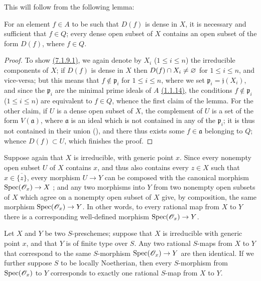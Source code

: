 This will follow from the following lemma:
\begin{lemma}[7.1.9.1]
\label{I.7.1.9.1}
For an element $f\in A$ to be such that $D(f)$ is dense in $X$, it is necessary and sufficient that $f\in Q$; every dense open subset of $X$ contains an open subset of the form $D(f)$, where $f\in Q$.
\end{lemma}

\begin{proof}
To show \hyperref[I.7.1.9]{(7.1.9.1)}, we again denote by $X_i$ ($1\leq i\leq n$) the irreducible components of $X$; if $D(f)$ is dense in $X$ then $D(f)\cap X_i\neq\varnothing$ for $1\leq i\leq n$, and vice-versa; but this means that $f\not\in\mathfrak{p}_i$ for $1\leq i\leq n$, where we set $\mathfrak{p}_i=\mathfrak{j}(X_i)$, and since the $\mathfrak{p}_i$ are the minimal prime ideals of $A$ \hyperref[I.1.1.14]{(1.1.14)}, the conditions $f\not\in\mathfrak{p}_i$ ($1\leq i\leq n$) are equivalent to $f\in Q$, whence the first claim of the lemma.
For the other claim, if $U$ is a dense open subset of $X$, the complement of $U$ is a set of the form $V(\mathfrak{a})$, where $\mathfrak{a}$ is an ideal which is not contained in any of the $\mathfrak{p}_i$; it is thus not contained in their union (\cite[p.~13]{I-10}), and there thus exists some $f\in\mathfrak{a}$ belonging to $Q$; whence $D(f)\subset U$, which finishes the proof.
\end{proof}

\begin{env}[7.1.10]
\label{I.7.1.10}
Suppose again that $X$ is irreducible, with generic point $x$.
Since every nonempty open subset $U$ of $X$ contains $x$, and thus also contains every $z\in X$ such that $x\in\overline{\{z\}}$, every morphism $U\to Y$ can be composed with the canonical morphism $\Spec(\sh{O}_x)\to X$ ; and any two morphisms into $Y$ from two nonempty open subsets of $X$ which agree on a nonempty open subset of $X$ give, by composition, the same morphism $\Spec(\sh{O}_x)\to Y$.
In other words, to every rational map from $X$ to $Y$ there is a corresponding well-defined morphism $\Spec(\sh{O}_x)\to Y$.
\end{env}

\begin{proposition}[7.1.11]
\label{I.7.1.11}
Let $X$ and $Y$ be two $S$-preschemes; suppose that $X$ is irreducible with generic point $x$, and that $Y$ is of finite type over $S$.
Any two rational $S$-maps from $X$ to $Y$ that correspond to the same $S$-morphism $\Spec(\sh{O}_x)\to Y$ are then identical.
If we further suppose $S$ to be locally Noetherian, then every $S$-morphism from $\operatorname{Spec}(\mathscr{O}_x)$ to $Y$ corresponds to exactly one rational $S$-map from $X$ to $Y$.
\end{proposition}

